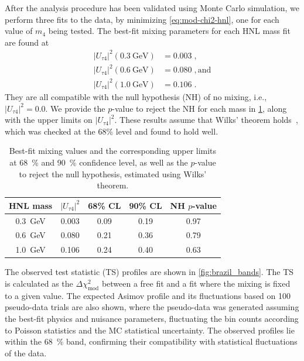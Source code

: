 \documentclass[
    aps,
    prd,
    reprint,
    amsmath,
    amssymb,
    nofootinbib,
    linenumbers,
    superscriptaddress,
    floatfix
]{revtex4-2}
\newcommand{\gev}{\giga\electronvolt}
\def\ut4{$|U_{\tau4}|^2$}
\def\nomath_ue4{|U_{e4}|^2}
\def\nomath_um4{|U_{\mu4}|^2}
\def\nomath_ut4{|U_{\tau4}|^2}
\renewcommand{\rm}{\mathrm}
\newcommand{\rm}{\mathrm}
\begin{document}
After the analysis procedure has been validated using Monte Carlo simulation, we perform three fits to the data, by minimizing \cref{eq:mod-chi2-hnl}, one for each value of $m_{4}$ being tested.
The best-fit mixing parameters for each HNL mass fit are found at
\begin{align*}
    |U_{\tau4}|^2(\SI{0.3}{\gev}) &= 0.003 \;, \\
    |U_{\tau4}|^2(\SI{0.6}{\gev}) &= 0.080 \;, \rm{and} \\
    |U_{\tau4}|^2(\SI{1.0}{\gev}) &= 0.106 \;.
\end{align*}
They are all compatible with the null hypothesis (NH) of no mixing, i.e., $\nomath_ut4=0.0$.
We provide the $p$-value to reject the NH for each mass in \cref{tab:best_fit_parameters_and_confidence_levels}, along with the upper limits on \ut4. 
These results assume that Wilks' theorem holds~\cite{wilks_theorem}, which was checked at the 68\% level and found to hold well.
\begin{table}[h]
    \begin{tabular}{ ccccc }
        \hline\hline
        \textbf{HNL mass} & \textbf{\ut4} & \textbf{68\% CL} & \textbf{90\% CL} & \textbf{NH $p$-value} \\    
        \hline\hline
        \SI{0.3}{\gev} & 0.003 & 0.09 & 0.19 & \SI{0.97}{} \\
        \SI{0.6}{\gev} & 0.080 & 0.21 & 0.36 & \SI{0.79}{} \\
        \SI{1.0}{\gev} & 0.106 & 0.24 & 0.40 & \SI{0.63}{} \\
        \hline
    \end{tabular}
    \internallinenumbers
    \caption{Best-fit mixing values and the corresponding upper limits at \SI{68}{\percent} and \SI{90}{\percent} confidence level, as well as the $p$-value to reject the null hypothesis, estimated using Wilks' theorem.}
    \label{tab:best_fit_parameters_and_confidence_levels}
\end{table}
The observed test statistic (TS) profiles are shown in \cref{fig:brazil_bands}. The TS is calculated as the $\Delta\chi^2_{\mathrm{mod}}$ between a free fit and a fit where the mixing is fixed to a given value.
The expected Asimov profile and its fluctuations based on 100 pseudo-data trials are also shown, where the pseudo-data was generated assuming the best-fit physics and nuisance parameters, fluctuating the bin counts according to Poisson statistics and the MC statistical uncertainty.
The observed profiles lie within the \SI{68}{\percent} band, confirming their compatibility with statistical fluctuations of the data.
\end{document}
